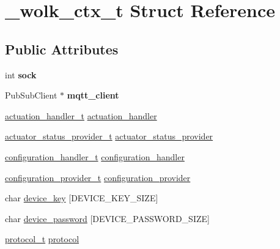 \hypertarget{struct__wolk__ctx__t}{}\section{\+\_\+wolk\+\_\+ctx\+\_\+t Struct Reference}
\label{struct__wolk__ctx__t}
\subsection*{Public Attributes}
\begin{DoxyCompactItemize}
\item 
\mbox{\label{struct__wolk__ctx__t_a2233b692159d4df06fda99457359cd31}} 
int {\bfseries sock}
\item 
\mbox{\label{struct__wolk__ctx__t_aa9463f61f22b652871f33506a24ee4cb}} 
Pub\+Sub\+Client $\ast$ {\bfseries mqtt\+\_\+client}
\item 
\hyperlink{WolkConn_8h_acde87869e807b1774680f3f2b5b04e2f}{actuation\+\_\+handler\+\_\+t} \hyperlink{struct__wolk__ctx__t_ac55ed80718abb1dca3027edda713ca57}{actuation\+\_\+handler}
\item 
\hyperlink{WolkConn_8h_af3e8919a04a293972b64605557287537}{actuator\+\_\+status\+\_\+provider\+\_\+t} \hyperlink{struct__wolk__ctx__t_aadae34ca3e3d99ed0e124ffd610f1edd}{actuator\+\_\+status\+\_\+provider}
\item 
\hyperlink{WolkConn_8h_a6662d0d41546795466cc2b398d8dcb08}{configuration\+\_\+handler\+\_\+t} \hyperlink{struct__wolk__ctx__t_a4d17880aa8086559923d94f678cecfbc}{configuration\+\_\+handler}
\item 
\hyperlink{WolkConn_8h_a64d56254d09f9e452751f32b3c5a39d3}{configuration\+\_\+provider\+\_\+t} \hyperlink{struct__wolk__ctx__t_a4b2c98179054515e4288812f21bff3a4}{configuration\+\_\+provider}
\item 
char \hyperlink{struct__wolk__ctx__t_a52168fce420127bfa577ffea6fce0306}{device\+\_\+key} \mbox{[}D\+E\+V\+I\+C\+E\+\_\+\+K\+E\+Y\+\_\+\+S\+I\+ZE\mbox{]}
\item 
char \hyperlink{struct__wolk__ctx__t_a3a57dc7e7475697302709e722863e736}{device\+\_\+password} \mbox{[}D\+E\+V\+I\+C\+E\+\_\+\+P\+A\+S\+S\+W\+O\+R\+D\+\_\+\+S\+I\+ZE\mbox{]}
\item 
\hyperlink{WolkConn_8h_a91e19fa4fff461493e1a41f7c7aa4e5f}{protocol\+\_\+t} \hyperlink{struct__wolk__ctx__t_ab98629a506ce39393254cf331189dc9a}{protocol}

\end{DoxyCompactItemize}
